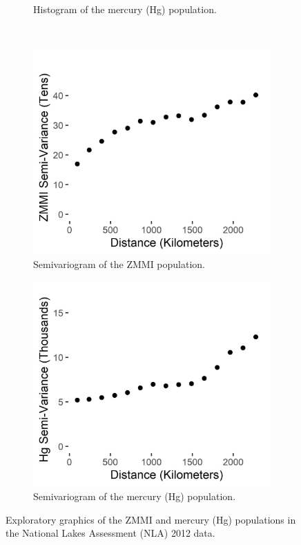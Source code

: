\documentclass[]{elsarticle} %
\begin{document}
\begin{figure}
\begin{subfigure}{0.49\textwidth}
  \caption{Histogram of the mercury (Hg) population.}
  \label{fig:mercury_hist}
\end{subfigure} \\
\begin{subfigure}{0.49\textwidth}
  \centering
  \includegraphics[width = 1\linewidth]{figures/zmmi_sv.jpeg}
  \caption{Semivariogram of the ZMMI population.}
  \label{fig:zmmi_sv_plot}
\end{subfigure}
\begin{subfigure}{0.49\textwidth}
  \centering
  \includegraphics[width = 1\linewidth]{figures/mercury_sv.jpeg}
  \caption{Semivariogram of the mercury (Hg) population.}
  \label{fig:mercury_sv_plot}
\end{subfigure}
\caption{Exploratory graphics of the ZMMI and mercury (Hg) populations in the National Lakes Assessment (NLA) 2012 data.}
\label{fig:zmmi}
\end{figure}
\end{document}
